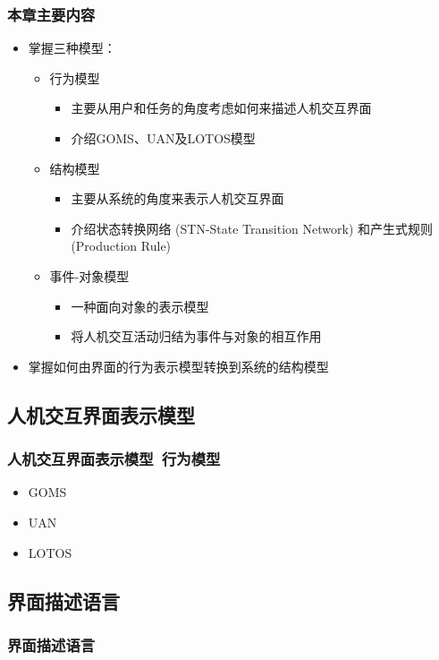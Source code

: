 \documentclass{beamer}
\begin{document}
\begin{frame}
	\frametitle{本章主要内容}
	\beamertemplatetransparentcovereddynamicmedium
	\begin{itemize}
		\item 掌握三种模型：
		\begin{itemize}
			\item 行为模型
			\begin{itemize}
				\item 主要从用户和任务的角度考虑如何来描述人机交互界面
				\item 介绍GOMS、UAN及LOTOS模型
			\end{itemize}
			\item 结构模型
			\begin{itemize}
				\item 主要从系统的角度来表示人机交互界面
				\item 介绍状态转换网络 (STN-State Transition Network) 和产生式规则 (Production Rule)
			\end{itemize}
			\item 事件-对象模型
			\begin{itemize}
				\item 一种面向对象的表示模型
				\item 将人机交互活动归结为事件与对象的相互作用
			\end{itemize}
		\end{itemize}
		\pause
		\item 掌握如何由界面的行为表示模型转换到系统的结构模型
	\end{itemize}
\end{frame}

\subsection{人机交互界面表示模型}
\begin{frame}
	\frametitle{{\small 人机交互界面表示模型}~\textbf{行为模型}}
	\begin{itemize}
		\item GOMS
		\item UAN
		\item LOTOS
	\end{itemize}
\end{frame}

\subsection{界面描述语言}
\begin{frame}
	\frametitle{界面描述语言}

\end{frame}
\end{document}
